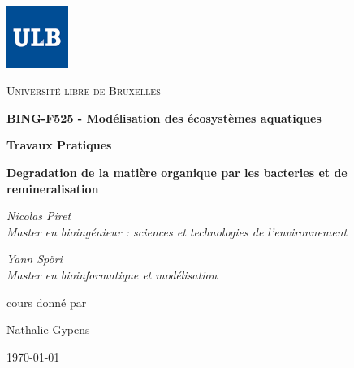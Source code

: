 \documentclass[12pt,a4paper]{article}
\begin{document}
{
\raggedleft
\includegraphics[width=0.15\textwidth]{ulbnorm.jpg}
\par\vspace{-1.8cm}
\centering
{\scshape\LARGE Université libre de Bruxelles \par}
\vspace{2.4cm}
{\Huge\bfseries BING-F525 - Modélisation des écosystèmes aquatiques\par}
\vspace{1.2cm}
{\Large\bfseries Travaux Pratiques\par}
\vspace{1.0cm}
{\LARGE\bfseries Degradation de la matière organique par les bacteries et de remineralisation\par}
\vspace{1.5cm}
{\Large\itshape Nicolas Piret\\Master en bioingénieur : sciences et technologies de l'environnement\par}
\vspace{0.5cm}
{\Large\itshape Yann Spöri\\Master en bioinformatique et modélisation\par}
\vfill
cours donné par\par
Nathalie Gypens%
\vfill
\begin{center}{\large \today}\end{center}
}
\newpage
{}

\tableofcontents
\newpage

%

\FloatBarrier
%
%
\end{document}
